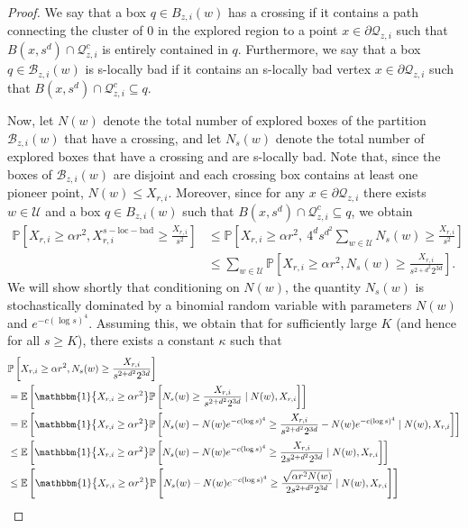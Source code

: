 \documentclass[11pt]{article}
\theoremstyle{definition}
\theoremstyle{remark}
\newcommand{\E}{\mathbb{E}}
\newcommand{\bP}{\mathbb{P}}
\numberwithin{equation}{section}
\theoremstyle{plain}
\theoremstyle{definition}
\theoremstyle{remark}
\theoremstyle{plain}
\newcommand{\ind}[1]{\mathbbm{1}\big\{#1\big\}}
\begin{document}
\begin{proof}
We say that a box $q \in B_{z,i}(w)$ has a crossing if it contains a path connecting the cluster of $0$ in the explored region to a point $x \in \partial \mathcal Q_{z,i}$ such that $B(x,s^d)\cap \mathcal Q_{z,i}^c$ is entirely contained in $q$. Furthermore, we say that a box $q \in \mathcal B_{z,i}(w)$ is s-locally bad if it contains an s-locally bad vertex $x \in \partial \mathcal Q_{z,i}$ such that $B(x, s^d)\cap \mathcal Q_{z,i}^c\subseteq q$.

Now, let $N(w)$ denote the total number of explored boxes of the partition $\mathcal B_{z,i}(w)$ that have a crossing, and let $N_s(w)$ denote the total number of explored boxes that have a crossing and are s-locally bad. Note that, since the boxes of $\mathcal B_{z,i}(w)$ are disjoint and each crossing box contains at least one pioneer point, $N(w)\le X_{r,i}$. Moreover, since for any $x \in \partial \mathcal Q_{z,i}$ there exists $w \in \mathcal U$ and a box $q \in B_{z,i}(w)$ such that $B(x,s^d) \cap \mathcal Q_{z,i}^c  \subseteq q$, we obtain
\begin{align*}
    \bP\left[X_{r,i}\ge \alpha r^2,X_{r,i}^{s-\mathrm{loc-bad}}\ge \frac{X_{r,i}}{s^2}\right]&\le  \bP\left[X_{r,i}\ge \alpha r^2,\:4^ds^{d^2}\sum_{w \in \mathcal U}N_{s}(w)\ge \frac{X_{r,i}}{s^2}\right]\\
    &\le \sum_{w \in \mathcal U}\bP\left[X_{r,i}\ge \alpha r^2,N_{s}(w)\ge \frac{X_{r,i}}{s^{2+d^2}2^{3d}}\right].
  \end{align*}
We will show shortly that conditioning on $N(w)$, the quantity $N_s(w)$ is stochastically dominated by a binomial random variable with parameters $N(w)$ and $e^{-c(\log s)^4}$. Assuming this, we obtain that for sufficiently large $K$ (and hence for all $s\ge K$), there exists a constant $\kappa$ such that
  \begin{align*}
&\bP\left[X_{r,i}\ge \alpha r^2,N_{s}(w)\ge \frac{X_{r,i}}{s^{2+d^2}2^{3d}}\right]\\
&=\E\left[\ind{X_{r,i}\ge \alpha r^2}\bP\left[N_{s}(w)\ge \frac{X_{r,i}}
{s^{2+d^2}2^{3d}}\mid N(w),X_{r,i}\right]\right]\\
&=\E\left[\ind{X_{r,i}\ge \alpha r^2}\bP\left[N_{s}(w)-N(w)e^{-c(\log s)^4}\ge \frac{X_{r,i}}
{s^{2+d^2}2^{3d}}-N(w)e^{-c(\log s)^4}\mid N(w),X_{r,i}\right]\right]\\
&\le \E\left[\ind{X_{r,i}\ge \alpha r^2}\bP\left[N_{s}(w)-N(w)e^{-c(\log s)^4}\ge \frac{X_{r,i}}
{2s^{2+d^2}2^{3d}}\mid N(w),X_{r,i}\right]\right]\\
&\le \E\left[\ind{X_{r,i}\ge \alpha r^2}\bP\left[N_{s}(w)-N(w)e^{-c(\log s)^4}\ge \frac{\sqrt{\alpha r^2 N(w)}}{2s^{2+d^2}2^{3d}}\mid N(w),X_{r,i}\right]\right]\\

\end{align*}
\end{proof}
\end{document}
